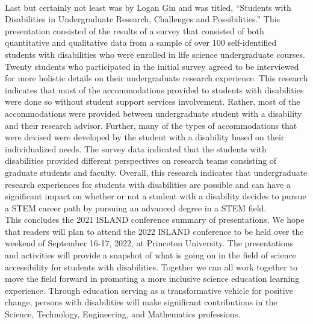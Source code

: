 \documentclass[11pt]{sig-alternate}
\begin{document}
\vspace{2.5 mm}\\Last but certainly not least was by Logan Gin and was titled, “Students with Disabilities in Undergraduate Research, Challenges and Possibilities.” This presentation consisted of the results of a survey that consisted of both quantitative and qualitative data from a sample of over 100 self-identified students with disabilities who were enrolled in life science undergraduate courses. Twenty students who participated in the initial survey agreed to be interviewed for more holistic details on their undergraduate research experience. This research indicates that most of the accommodations provided to students with disabilities were done so without student support services involvement. Rather, most of the accommodations were provided between undergraduate student with a disability and their research advisor. Further, many of the types of accommodations that were devised were developed by the student with a disability based on their individualized needs. The survey data indicated that the students with disabilities provided different perspectives on research teams consisting of graduate students and faculty. Overall, this research indicates that undergraduate research experiences for students with disabilities are possible and can have a significant impact on whether or not a student with a disability decides to pursue a STEM career path by pursuing an advanced degree in a STEM field.
\vspace{2.5 mm}\\This concludes the 2021 ISLAND conference summary of presentations. We hope that readers will plan to attend the 2022 ISLAND conference to be held over the weekend of September 16-17, 2022, at Princeton University. The presentations and activities will provide a snapshot of what is going on in the field of science accessibility for students with disabilities. Together we can all work together to move the field forward in promoting a more inclusive science education learning experience. Through education serving as a transformative vehicle for positive change, persons with disabilities will make significant contributions in the Science, Technology, Engineering, and Mathematics professions. 
\end{document}
